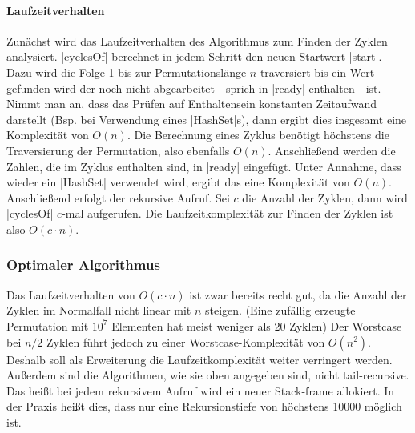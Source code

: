 \paragraph{Laufzeitverhalten}
Zunächst wird das Laufzeitverhalten des Algorithmus zum Finden der Zyklen analysiert.
|cyclesOf| berechnet in jedem Schritt den neuen Startwert |start|.
Dazu wird die Folge 1 bis zur Permutationslänge $n$ traversiert bis ein Wert gefunden wird der noch nicht abgearbeitet - sprich in |ready| enthalten - ist.
Nimmt man an, dass das Prüfen auf Enthaltensein konstanten Zeitaufwand darstellt (Bsp. bei Verwendung eines |HashSet|s), dann ergibt dies insgesamt eine Komplexität von $O(n)$.
Die Berechnung eines Zyklus benötigt höchstens die Traversierung der Permutation, also ebenfalls $O(n)$. %
Anschließend werden die Zahlen, die im Zyklus enthalten sind, in |ready| eingefügt. Unter Annahme, dass wieder ein |HashSet| verwendet wird, ergibt das eine Komplexität von $O(n)$.
Anschließend erfolgt der rekursive Aufruf. Sei $c$ die Anzahl der Zyklen, dann wird |cyclesOf| $c$-mal aufgerufen.
Die Laufzeitkomplexität zur Finden der Zyklen ist also $O(c \cdot n)$. \\

\subsubsection{Optimaler Algorithmus} %
Das Laufzeitverhalten von $O(c \cdot n)$ ist zwar bereits recht gut, da die Anzahl der Zyklen im Normalfall nicht linear mit $n$ steigen.
(Eine zufällig erzeugte Permutation mit $10^7$ Elementen hat meist weniger als 20 Zyklen)%
Der Worstcase bei $n/2$ Zyklen führt jedoch zu einer Worstcase-Komplexität von $O(n^2)$. \\
Deshalb soll als Erweiterung die Laufzeitkomplexität weiter verringert werden. \\
Außerdem sind die Algorithmen, wie sie oben angegeben sind, nicht tail-recursive.
Das heißt bei jedem rekursivem Aufruf wird ein neuer Stack-frame allokiert.
In der Praxis heißt dies, dass nur eine Rekursionstiefe von höchstens 10000 möglich ist.

